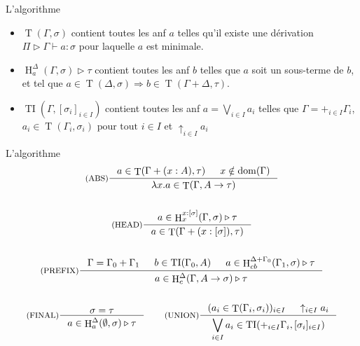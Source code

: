 \documentclass{beamer}
\DeclareMathOperator{\iT}{T}
\DeclareMathOperator{\iH}{H}
\DeclareMathOperator{\iTI}{TI}
\DeclareMathOperator{\iDom}{dom}
\begin{document}
    \begin{frame}{L'algorithme}
    
    \begin{itemize}
    \item $\iT(\Gamma, \sigma)$ contient toutes les anf $a$ telles qu'il existe une dérivation $\Pi \triangleright \Gamma \vdash a : \sigma$ pour laquelle $a$ est minimale. 
    \item $\iH^\Delta_a(\Gamma, \sigma) \triangleright \tau$ contient toutes les anf $b$ telles que $a$ soit un sous-terme de $b$, et tel que  $a \in \iT(\Delta, \sigma) \Rightarrow b \in \iT(\Gamma + \Delta, \tau)$.
    \item $\iTI(\Gamma, [\sigma_i]_{i \in I})$ contient toutes les anf $a = \bigvee_{i\in I}a_i$ telles que  $ \Gamma = +_{i \in I} \Gamma_i $, $ a_i \in \iT(\Gamma_i, \sigma_i)\text{ pour tout }i \in I $ et $\uparrow_{i \in I}a_i$
    \end{itemize}
    \end{frame}
    
    \begin{frame}{L'algorithme}
        \begin{gather*}
        \inference[(ABS)]{a \in \iT(\Gamma + (x : A), \tau) & x \notin \iDom(\Gamma)}{\lambda x.a \in \iT(\Gamma, A \rightarrow \tau)}
        \\ \\
        \inference[(HEAD)]{a \in \iH^{x:[\sigma]}_x(\Gamma, \sigma) \triangleright \tau}{a \in\iT(\Gamma + (x:[\sigma]), \tau) }
        \\ \\
        \inference[(PREFIX)]{\Gamma = \Gamma_0 + \Gamma_1 & b \in \iTI(\Gamma_0, A) & a \in \iH^{\Delta + \Gamma_0}_{cb}(\Gamma_1, \sigma) \triangleright \tau}{a \in \iH^{\Delta}_c(\Gamma, A \rightarrow \sigma) \triangleright \tau}
        \\ \\
        \inference[(FINAL)]{\sigma = \tau}{a \in \iH^{\Delta}_a(\emptyset, \sigma) \triangleright \tau}
        \qquad
        \inference[(UNION)]{(a_i \in \iT(\Gamma_i, \sigma_i))_{i \in I} & \uparrow_{i \in I}a_i}{\displaystyle \bigvee_{i \in I} a_i \in \iTI(+_{i \in I}\Gamma_i, [\sigma_i]_{i \in I}) }
        \end{gather*}
    \end{frame}
    
\end{document}
